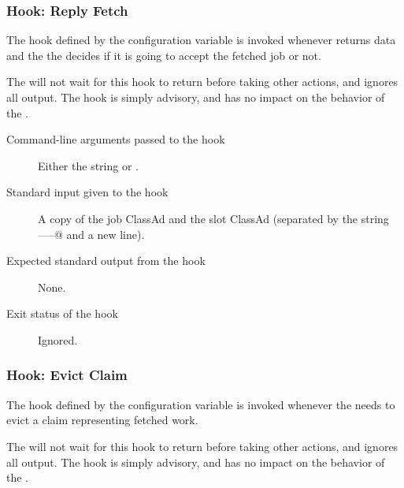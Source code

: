 \subsubsection{\label{sec:job-hooks-reply-fetch}
Hook: Reply Fetch}

The hook defined by the configuration variable
 is invoked whenever
 returns data and the the 
decides if it is going to accept the fetched job or not.

The  will not wait for this hook to return before
taking other actions, and ignores all output.
The hook is simply advisory, and has no impact on the behavior of the
.

\begin{description}
\item[Command-line arguments passed to the hook]
  Either the string \verb@accept@ or \verb@reject@.

\item[Standard input given to the hook]
  A copy of the job ClassAd and the slot ClassAd
  (separated by the string \verb@-----@ and a new line).

\item[Expected standard output from the hook]
  None.

\item[Exit status of the hook]
  Ignored.
\end{description}


\subsubsection{\label{sec:job-hooks-evict-claim}
Hook: Evict Claim}

The hook defined by the configuration variable
 is invoked whenever the 
needs to evict a claim representing fetched work.

The  will not wait for this hook to return before
taking other actions, and ignores all output.
The hook is simply advisory, and has no impact on the behavior of the
.

